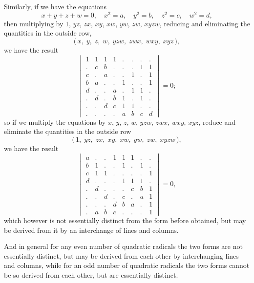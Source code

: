 \documentclass[11pt,a4paper]{article}
\theoremstyle{plain}
\begin{document}
Similarly, if we have the equations
\[x + y + z + w = 0, \quad x^2 = a, \quad y^2 = b, \quad z^2 = c, \quad w^2 = d,\]
then multiplying by $1$, $yz$, $zx$, $xy$, $xw$, $yw$, $zw$, $xyzw$, reducing and eliminating the quantities in the outside row,
\[\bigl(\, x,\; y,\; z,\; w,\; yzw,\; zwx,\; wxy,\; xyz\,\bigr),\]
we have the result
\[\begin{vmatrix}
1 & 1 & 1 & 1 & . & . & . & . \\
. & c & b & . & . & . & 1 & 1 \\
c & . & a & . & . & 1 & . & 1 \\
b & a & . & . & 1 & . & . & 1 \\
d & . & . & a & . & 1 & 1 & . \\
. & d & . & b & 1 & . & 1 & . \\
. & . & d & c & 1 & 1 & . & . \\
. & . & . & . & a & b & c & d
\end{vmatrix} = 0;\]
so if we multiply the equations by $x$, $y$, $z$, $w$, $yzw$, $zwx$, $wxy$, $xyz$, reduce and eliminate the quantities in the outside row
\[\bigl(\, 1,\; yz,\; zx,\; xy,\; xw,\; yw,\; zw,\; xyzw\,\bigr),\]
we have the result
\[\begin{vmatrix}
a & . & . & 1 & 1 & 1 & . & . \\
b & 1 & . & . & 1 & . & 1 & . \\
c & 1 & 1 & . & . & . & . & 1 \\
d & . & . & . & 1 & 1 & 1 & . \\
. & d & . & . & . & c & b & 1 \\
. & . & d & . & c & . & a & 1 \\
. & . & . & d & b & a & . & 1 \\
. & a & b & c & . & . & . & 1
\end{vmatrix} = 0,
\]
which however is not essentially distinct from the form before obtained, but may be derived from it by an interchange of lines and columns.

And in general for any even number of quadratic radicals the two forms are not essentially distinct, but may be derived from each other by interchanging lines and columns, while for an odd number of quadratic radicals the two forms cannot be so derived from each other, but are essentially distinct.
\end{document}
